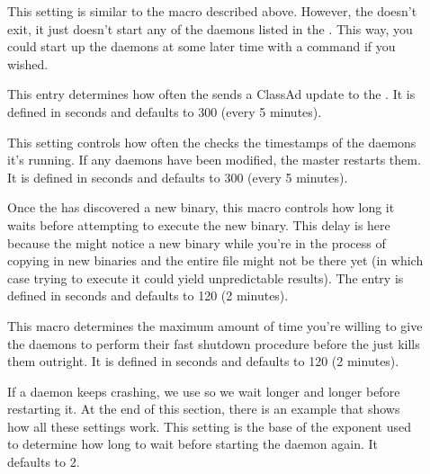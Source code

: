 \begin{description}
\item[] \label{param:StartDaemons} This setting
  is similar to the  macro described above.
  However, the  doesn't exit, it just doesn't start any
  of the daemons listed in the .  This way, you
  could start up the daemons at some later time with a 
  command if you wished.

\item[]
  \label{param:MasterUpdateInterval} This entry determines how often
  the  sends a ClassAd update to the
  .  It is defined in seconds and defaults to 300
  (every 5 minutes).
  
\item[]
  \label{param:MasterCheckNewExecInterval} This
  setting controls how often the  checks the timestamps
  of the daemons it's running.  If any daemons have been modified, the
  master restarts them.  It is defined in seconds and defaults to 300
  (every 5 minutes).

\item[]
  \label{param:MasterNewBinaryDelay} Once the  has
  discovered a new binary, this macro controls how long it waits
  before attempting to execute the new binary.  This delay is here
  because the  might notice a new binary while you're
  in the process of copying in new binaries and the entire file might
  not be there yet (in which case trying to execute it could yield
  unpredictable results).  The entry is defined in seconds and
  defaults to 120 (2 minutes).

\item[]
  \label{param:ShutdownFastTimeout} This macro determines the maximum
  amount of time you're willing to give the daemons to perform their
  fast shutdown procedure before the  just kills them
  outright.  It is defined in seconds and defaults to 120 (2 minutes).

\item[]
  \label{param:MasterBackoffFactor} If a daemon keeps crashing, we
  use  so we wait longer and longer before
  restarting it.  At the end of this section, there is an example that
  shows how all these settings work.  This setting is the base of the
  exponent used to determine how long to wait before starting the
  daemon again.  It defaults to 2.


\end{description}
